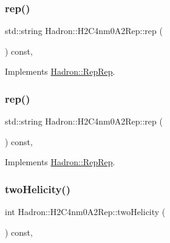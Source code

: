 \subsubsection{\texorpdfstring{rep()}{rep()}\hspace{0.1cm}{\footnotesize\ttfamily [4/5]}}
{\footnotesize\ttfamily std\+::string Hadron\+::\+H2\+C4nm0\+A2\+Rep\+::rep (\begin{DoxyParamCaption}{ }\end{DoxyParamCaption}) const\hspace{0.3cm}{\ttfamily [inline]}, {\ttfamily [virtual]}}



Implements \mbox{\hyperlink{structHadron_1_1RepRep_ab3213025f6de249f7095892109575fde}{Hadron\+::\+Rep\+Rep}}.

\mbox{\label{structHadron_1_1H2C4nm0A2Rep_acf769194280e756693be59efab932c8d}} 
\subsubsection{\texorpdfstring{rep()}{rep()}\hspace{0.1cm}{\footnotesize\ttfamily [5/5]}}
{\footnotesize\ttfamily std\+::string Hadron\+::\+H2\+C4nm0\+A2\+Rep\+::rep (\begin{DoxyParamCaption}{ }\end{DoxyParamCaption}) const\hspace{0.3cm}{\ttfamily [inline]}, {\ttfamily [virtual]}}



Implements \mbox{\hyperlink{structHadron_1_1RepRep_ab3213025f6de249f7095892109575fde}{Hadron\+::\+Rep\+Rep}}.

\mbox{\label{structHadron_1_1H2C4nm0A2Rep_a30b35f728294aa3dc99c1186ca21775e}} 
\subsubsection{\texorpdfstring{twoHelicity()}{twoHelicity()}\hspace{0.1cm}{\footnotesize\ttfamily [1/3]}}
{\footnotesize\ttfamily int Hadron\+::\+H2\+C4nm0\+A2\+Rep\+::two\+Helicity (\begin{DoxyParamCaption}{ }\end{DoxyParamCaption}) const\hspace{0.3cm}{\ttfamily [inline]}, {\ttfamily [virtual]}}

